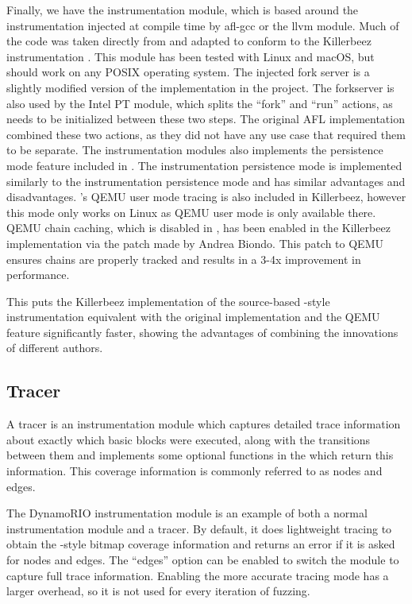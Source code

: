 Finally, we have the \AFL{} instrumentation module, which is based around the
instrumentation injected at compile time by afl-gcc or the \AFL{}
llvm module. Much of the code was taken directly from \AFL{} and adapted to
conform to the Killerbeez instrumentation \API{}. This module has been tested
with Linux and macOS, but should work on any POSIX operating system.
The injected fork server is a slightly modified version of the
implementation in the \AFL{} project. The forkserver is also used by the
Intel PT module, which splits the ``fork'' and ``run'' actions, as \IPT{} needs
to be initialized between these two steps.  The original AFL implementation
combined these two actions, as they did not have any use case that required
them to be separate.  The \AFL{} instrumentation modules also
implements the persistence mode feature
included in \AFL{}.  The \AFL{} instrumentation persistence mode is implemented
similarly to the \IPT{} instrumentation persistence mode and has similar
advantages and disadvantages. \AFL{}'s QEMU user mode tracing is also included in Killerbeez,
however this mode only works on Linux as QEMU user mode is only
available there.  QEMU chain caching, which is disabled in \AFL{},
has been enabled in the Killerbeez implementation via the patch made by Andrea Biondo.\cite{qemuspeedup} This patch
to QEMU ensures chains are properly tracked and results in a 3-4x improvement
in performance.

This puts the Killerbeez implementation of the source-based \AFL{}-style
instrumentation equivalent with the original implementation and the QEMU
feature significantly faster, showing the advantages of combining the
innovations of different authors.

\subsection{Tracer} \label{Tracer}
A tracer is an instrumentation module which captures detailed trace
information about exactly which basic blocks were executed, along with the
transitions between them and implements some optional functions in the \API{}
which return this information.  This coverage information is commonly referred
to as nodes and edges.

The DynamoRIO instrumentation module is an example of both a normal
instrumentation module and a tracer. By default, it does lightweight tracing to
obtain the \AFL{}-style bitmap coverage information and returns an error if it
is asked for nodes and edges. The ``edges'' option can be enabled to
switch the module to capture full trace information.
Enabling the more accurate tracing mode has a larger overhead, so it is not
used for every iteration of fuzzing.

